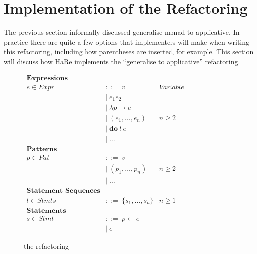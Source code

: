 \section{Implementation of the Refactoring}
\label{sec:refacImp}

The previous section informally discussed \DIFdelbegin {}\DIFdelend \DIFaddbegin {}\DIFaddend generalise monad to applicative\DIFdelbegin {}\DIFdelend \DIFaddbegin {}\DIFaddend . In practice there are quite a few options that implementers will make when writing this refactoring, including how parentheses are inserted, for example. This section will discuss \DIFdelbegin {}\DIFdelend \DIFaddbegin {}\DIFaddend how HaRe implements the ``generalise to applicative'' refactoring.

\DIFdelbegin %
\DIFdelend \begin{figure}[t]
	\begin{math}
		\begin{aligned}
\textbf{Expressions}\\
e \in Expr\ &::=\ v\qquad &Variable\\
&|\ e_1 e_2\\
&|\ \lambda p \rightarrow e\\
&|\ (e_1, \ldots, e_n) &n \geq 2\\
&|\ \textbf{do}\ l\ e\\
&|\ \ldots\\
\textbf{Patterns}\\
p \in Pat\ &::=\ v\\
&|\ (p_1, \ldots, p_n) &n \geq 2\\
&|\ \ldots \\
\textbf{Statement Sequences}\\
l \in Stmts\ &::=\ \{s_1, \ldots, s_n\} &n \geq 1\\
\textbf{Statements}\\
s \in Stmt\ &::=\ p \leftarrow e\\
&|\ e
		\end{aligned}
	\end{math}
	\caption{\DIFdelbeginFL {}\DIFdelendFL \DIFaddbeginFL {}\DIFaddendFL the refactoring\DIFdelbeginFL {}\DIFdelendFL }
	\label{syntax}
\end{figure}

